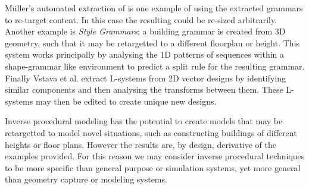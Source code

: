 


M\"{u}ller's automated extraction of \facades{} is one example of using the extracted grammars to re-target content. In this case the resulting \facade{} could be re-sized arbitrarily. Another example is \emph{Style Grammars}\cite{Aliaga07}; a building grammar is created from 3D geometry, such that it may be retargetted to a different floorplan or height. This system works principally by analysing the 1D patterns of sequences within a shape-grammar like environment to predict a split rule for the resulting grammar.
Finally Vstava et al. extract L-systems from 2D vector designs by identifying similar components and then analysing the transforms between them\cite{Vstava10}. These L-systems may then be edited to create unique new designs.

Inverse procedural modeling has the potential to create models that may be retargetted to model novel situations, such as constructing buildings of different heights or floor plans. However the results are, by design, derivative of the examples provided. For this reason we may consider inverse procedural techniques to be more specific than general purpose or simulation systems, yet more general than geometry capture or modeling systems. 





